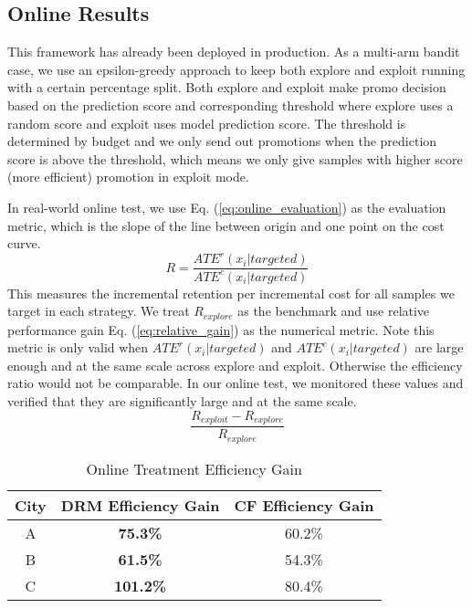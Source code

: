 \subsection{Online Results}
This framework has already been deployed in production. As a multi-arm bandit \cite{kuleshov2014algorithms} case, we use an epsilon-greedy approach to keep both explore and exploit running with a certain percentage split. Both explore and exploit make promo decision based on the prediction score and corresponding threshold where explore uses a random score and exploit uses model prediction score. The threshold is determined by budget and we only send out promotions when the prediction score is above the threshold, which means we only give samples with higher score (more efficient) promotion in exploit mode.

In real-world online test, we use Eq. (\ref{eq:online_evaluation}) as the evaluation metric, which is the slope of the line between origin and one point on the cost curve.
\begin{equation}
  \label{eq:online_evaluation}
  R = \frac{ATE^r(x_i | targeted)}{ATE^c(x_i | targeted)}
\end{equation}
This measures the incremental retention per incremental cost for all samples we target in each strategy. We treat $R_{explore}$ as the benchmark and use relative performance gain Eq. (\ref{eq:relative_gain}) as the numerical metric. Note this metric is only valid when $ATE^r(x_i | targeted)$ and $ATE^c(x_i | targeted)$ are large enough and at the same scale across explore and exploit. Otherwise the efficiency ratio would not be comparable. In our online test, we monitored these values and verified that they are significantly large and at the same scale.
\begin{equation}
  \label{eq:relative_gain}
  \frac{R_{exploit}-R_{explore}}{R_{explore}}
\end{equation}

\begin{table}
  \caption{Online Treatment Efficiency Gain}
  \label{tab:3}
  \begin{tabular}{ccc}
    \toprule
    City & DRM Efficiency Gain & CF Efficiency Gain\\
    \midrule
    A & \textbf{75.3\%} & 60.2\%\\
    B & \textbf{61.5\%} & 54.3\%\\
    C & \textbf{101.2\%} & 80.4\%\\
  \bottomrule
\end{tabular}
\end{table}

